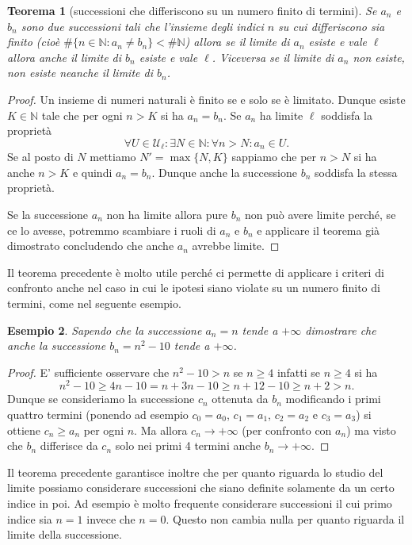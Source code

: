 \documentclass[italian,a4paper,oneside,headinclude]{scrbook}
\newcommand{\U}{\mathcal U}
\newcommand{\NN}{\mathbb N}
\newtheorem{theorem}{Teorema}
\newtheorem{example}[theorem]{Esempio}
\begin{document}
\begin{theorem}[successioni che differiscono su un numero finito di termini]
Se $a_n$ e $b_n$ sono due successioni tali che l'insieme degli indici
$n$ su cui differiscono sia finito
(cioè $\#\{n\in \NN\colon a_n \neq b_n\} < \# \NN$)
allora se il limite di $a_n$ esiste e vale $\ell$ allora
anche il limite di $b_n$ esiste e vale $\ell$.
Viceversa se il limite di $a_n$ non esiste, non esiste neanche il limite
di $b_n$.
\end{theorem}
%
\begin{proof}
Un insieme di numeri naturali è finito se e solo se è limitato.
Dunque esiste $K\in \NN$ tale che per ogni $n>K$ si ha $a_n = b_n$.
Se $a_n$ ha limite $\ell$ soddisfa la proprietà
\[
 \forall U \in \U_\ell \colon
 \exists N\in \NN\colon \forall n > N \colon a_n \in U.
\]
Se al posto di $N$ mettiamo $N' = \max\{N,K\}$ sappiamo che per $n>N$
si ha anche $n>K$ e quindi $a_n=b_n$. Dunque anche la successione $b_n$
soddisfa la stessa proprietà.

Se la successione $a_n$ non ha limite allora pure $b_n$ non può avere limite
perché, se ce lo avesse, potremmo scambiare i ruoli di $a_n$ e $b_n$
e applicare il teorema già dimostrato concludendo che anche $a_n$ avrebbe limite.
\end{proof}

Il teorema precedente è molto utile perché ci permette di applicare
i criteri di confronto anche nel caso in cui le ipotesi siano violate
su un numero finito di termini, come nel seguente esempio.

\begin{example}
Sapendo che la successione $a_n = n$ tende a $+\infty$ dimostrare
che anche la successione $b_n = n^2-10$ tende a $+\infty$.
\end{example}
%
\begin{proof}
E' sufficiente osservare che $n^2-10 > n$ se $n\ge 4$ infatti
se $n\ge 4$ si ha
\[
n^2 - 10 \ge 4 n -10 = n + 3n - 10 \ge n + 12 -10 \ge n+2 > n.
\]
Dunque se consideriamo la successione $c_n$ ottenuta da $b_n$
modificando i primi quattro termini (ponendo ad esempio $c_0 = a_0$,
$c_1=a_1$, $c_2=a_2$ e $c_3=a_3$) si ottiene $c_n\ge a_n$ per ogni $n$.
Ma allora $c_n \to +\infty$ (per confronto con $a_n$) ma visto che
$b_n$ differisce da $c_n$ solo nei primi 4 termini anche $b_n\to +\infty$.
\end{proof}

Il teorema precedente garantisce inoltre
che per quanto riguarda lo studio del limite possiamo considerare
successioni che siano definite solamente da un certo indice in poi.
Ad esempio è molto frequente considerare successioni il cui primo indice sia
$n=1$ invece che $n=0$. Questo non cambia nulla per quanto riguarda il limite
della successione.
\end{document}
